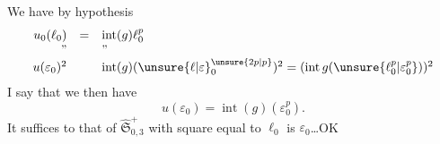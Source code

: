 We have by hypothesis
\[
\begin{array}{rcl}
u_0(\ell_0)&=&\operatorname{int}(g)\ell_0^p\\
\text{''}&&\text{''}\\
u(\varepsilon_0)^2&&
\operatorname{int}(g)(\unsure{\ell|\varepsilon}_0^{\unsure{2p|p}})^2
=(\operatorname{int}g(\unsure{\ell_0^p|\varepsilon_0^p}))^2
\end{array}
\]
I say that we then have
\[
u(\varepsilon_0)=\operatorname{int}(g)(\varepsilon_0^p).
\]
It suffices to  that
  of
$\widehat{\mathfrak S}_{0,3}^{+}$ with square equal to $\ell_0$ is $\varepsilon_0$\ldots\quad OK

